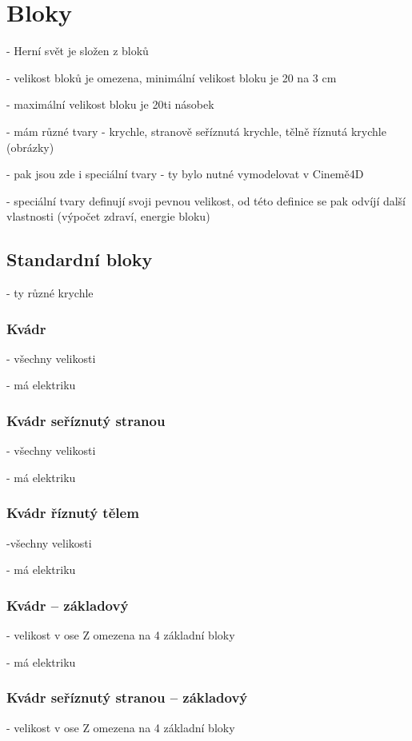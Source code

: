 
\section{Bloky}

- Herní svět je složen z bloků

- velikost bloků je omezena, minimální velikost bloku je 20 na 3 cm

- maximální velikost bloku je 20ti násobek

- mám různé tvary - krychle, stranově seříznutá krychle, tělně říznutá krychle (obrázky)


- pak jsou zde i speciální tvary - ty bylo nutné vymodelovat v Cinemě4D


- speciální tvary definují svoji pevnou velikost, od této definice se pak odvíjí další vlastnosti (výpočet zdraví, energie bloku)




\subsection{Standardní bloky}
- ty různé krychle

\subsubsection{Kvádr}
- všechny velikosti

- má elektriku

\subsubsection{Kvádr seříznutý stranou}
- všechny velikosti

- má elektriku

\subsubsection{Kvádr říznutý tělem}
-všechny velikosti

- má elektriku

\subsubsection{Kvádr -- základový}
- velikost v ose Z omezena na 4 základní bloky

- má elektriku

\subsubsection{Kvádr seříznutý stranou -- základový}
- velikost v ose Z omezena na 4 základní bloky


